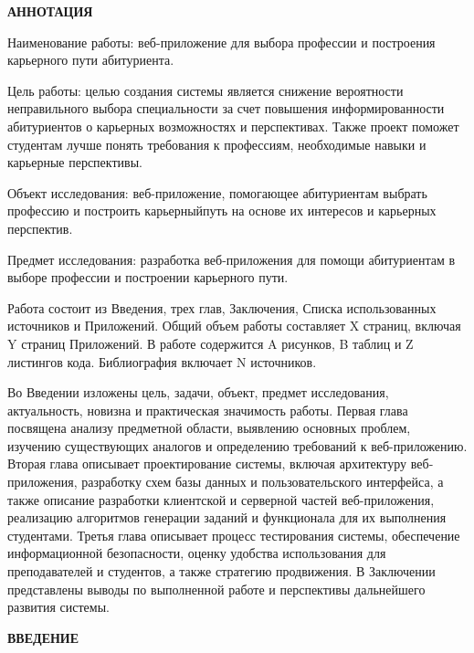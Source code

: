 \newpage
\begin{center}
  \textbf{\large АННОТАЦИЯ}
\end{center}

Наименование работы: веб-приложение для выбора профессии и построения карьерного пути абитуриента.

Цель работы: целью создания системы является снижение вероятности неправильного выбора специальности 
за счет повышения информированности абитуриентов о карьерных возможностях и перспективах. Также проект 
поможет студентам лучше понять требования к профессиям, необходимые навыки и карьерные перспективы.

Объект исследования: веб-приложение, помогающее абитуриентам выбрать профессию и построить карьерныйпуть 
на основе их интересов и карьерных перспектив.

Предмет исследования: разработка веб-приложения для помощи абитуриентам в выборе профессии и построении 
карьерного пути.

Работа состоит из Введения, трех глав, Заключения, Списка использованных источников и Приложений. Общий 
объем работы составляет X страниц, включая Y страниц Приложений. В работе содержится A рисунков, B 
таблиц и Z листингов кода. Библиография включает N источников.

Во Введении изложены цель, задачи, объект, предмет исследования, актуальность, новизна и практическая 
значимость работы. Первая глава посвящена анализу предметной области, выявлению основных проблем, 
изучению существующих аналогов и определению требований к веб-приложению. Вторая глава описывает 
проектирование системы, включая архитектуру веб-приложения, разработку схем базы данных и 
пользовательского интерфейса, а также описание разработки клиентской и серверной частей веб-приложения, 
реализацию алгоритмов генерации заданий и функционала для их выполнения студентами. Третья глава 
описывает процесс тестирования системы, обеспечение информационной безопасности, оценку удобства 
использования для преподавателей и студентов, а также стратегию продвижения. В Заключении представлены 
выводы по выполненной работе и перспективы дальнейшего развития системы.

\onehalfspacing
\setcounter{page}{6}

\newpage
\renewcommand{\contentsname}{\centerline{\large СОДЕРЖАНИЕ}}
\tableofcontents

\newpage
\begin{center}
  \textbf{\large ВВЕДЕНИЕ}
\end{center}


